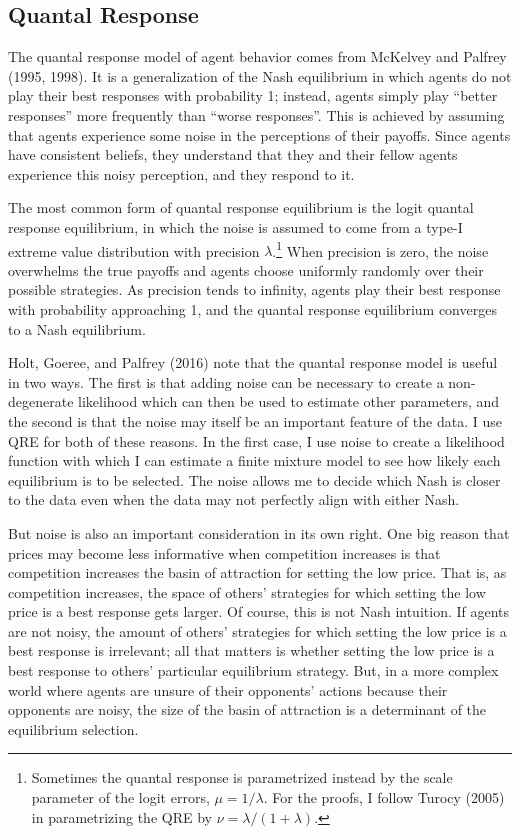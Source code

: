 \documentclass[12pt]{article}
\begin{document}


\subsection{Quantal Response}

The quantal response model of agent behavior comes from McKelvey and Palfrey (1995, 1998). It is a generalization of the Nash equilibrium in which agents do not play their best responses with probability 1; instead, agents simply play ``better responses'' more frequently than ``worse responses''. This is achieved by assuming that agents experience some noise in the perceptions of their payoffs. Since agents have consistent beliefs, they understand that they and their fellow agents experience this noisy perception, and they respond to it. 

The most common form of quantal response equilibrium is the logit quantal response equilibrium, in which the noise is assumed to come from a type-I extreme value distribution with precision $\lambda$.\footnote{Sometimes the quantal response is parametrized instead by the scale parameter of the logit errors, $\mu = 1/\lambda$. For the proofs, I follow Turocy (2005) in parametrizing the QRE by $\nu = \lambda / (1 + \lambda)$.} When precision is zero, the noise overwhelms the true payoffs and agents choose uniformly randomly over their possible strategies. As precision tends to infinity, agents play their best response with probability approaching 1, and the quantal response equilibrium converges to a Nash equilibrium.

Holt, Goeree, and Palfrey (2016) note that the quantal response model is useful in two ways. The first is that adding noise can be necessary to create a non-degenerate likelihood which can then be used to estimate other parameters, and the second is that the noise may itself be an important feature of the data. I use QRE for both of these reasons. In the first case, I use noise to create a likelihood function with which I can estimate a finite mixture model to see how likely each equilibrium is to be selected. The noise allows me to decide which Nash is closer to the data even when the data may not perfectly align with either Nash. 

But noise is also an important consideration in its own right. One big reason that prices may become less informative when competition increases is that competition increases the basin of attraction for setting the low price. That is, as competition increases, the space of others' strategies for which setting the low price is a best response gets larger. Of course, this is not Nash intuition. If agents are not noisy, the amount of others' strategies for which setting the low price is a best response is irrelevant; all that matters is whether setting the low price is a best response to others' particular equilibrium strategy. But, in a more complex world where agents are unsure of their opponents' actions because their opponents are noisy, the size of the basin of attraction is a determinant of the equilibrium selection.
\end{document}
